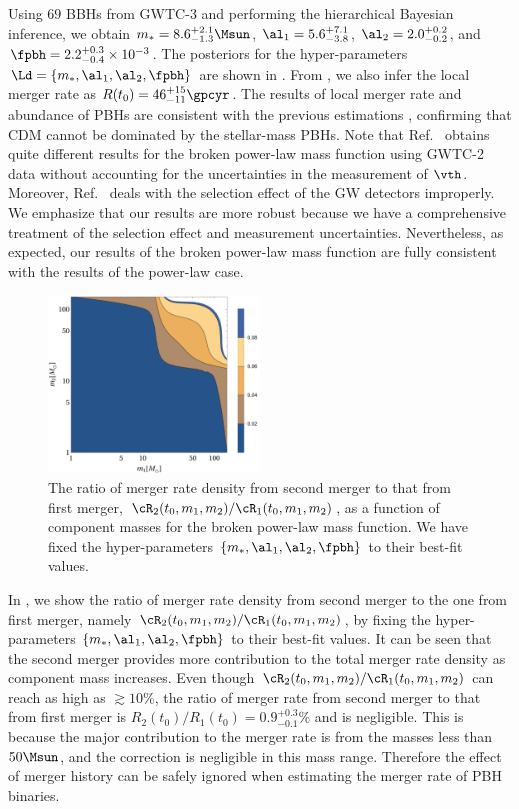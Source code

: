 \documentclass[
reprint,           %
superscriptaddress,%
amsmath,           %
amssymb,           %
aps,               %
prd,               %
notitlepage,       %
longbibliography,  %
floatfix,          %
nofootinbib,
]{revtex4-1}
\begin{document}
Using $69$ BBHs from GWTC-3 and performing the hierarchical Bayesian inference, we obtain $m_* = 8.6^{+2.1}_{-1.3} \Msun$, $\al_1 = 5.6^{+7.1}_{-3.8}$, $\al_2 = 2.0^{+0.2}_{-0.2}$, and $\fpbh = 2.2^{+0.3}_{-0.4} \times 10^{-3}$. The posteriors for the hyper-parameters $\Ld = \{m_*, \al_1, \al_2, \fpbh\}$ are shown in . From , we also infer the local merger rate as $R(t_0) = 46^{+15}_{-11} \gpcyr$. The results of local merger rate and abundance of PBHs are consistent with the previous estimations \cite{Chen:2018czv,Chen:2018rzo,Chen:2019irf,Wu:2020drm,Chen:2021nxo,Chen:2022fda}, confirming that CDM cannot be dominated by the stellar-mass PBHs. Note that Ref.~\cite{Deng:2021ezy} obtains quite different results for the broken power-law mass function using GWTC-2 data without accounting for the uncertainties in the measurement of $\vth$. Moreover, Ref.~\cite{Deng:2021ezy} deals with the selection effect of the GW detectors improperly. We emphasize that our results are more robust because we have a comprehensive treatment of the selection effect and measurement uncertainties. Nevertheless, as expected, our results of the broken power-law mass function are fully consistent with the results of the power-law case.

\begin{figure}[tbp!]
	\centering
	\includegraphics[width=0.5\textwidth]{ratio-bpower.pdf}
	\caption{\label{ratio-bpower}The ratio of merger rate density from second merger to that from first merger, $\cR_2(t_0, m_1, m_2)/\cR_1(t_0, m_1, m_2)$, as a function of component masses for the broken power-law mass function. We have fixed the hyper-parameters $\{m_*, \al_1, \al_2, \fpbh\}$ to their best-fit values.}
\end{figure}

In , we show the ratio of merger rate density from second merger to the one from first merger, namely $\cR_2(t_0, m_1, m_2)/\cR_1(t_0, m_1, m_2)$, by fixing the hyper-parameters $\{m_*, \al_1, \al_2, \fpbh\}$ to their best-fit values. It can be seen that the second merger provides more contribution to the total merger rate density as component mass increases. Even though $\cR_2(t_0, m_1, m_2)/\cR_1(t_0, m_1, m_2)$ can reach as high as $\gtrsim 10\%$, the ratio of merger rate from second merger to that from first merger is $R_2(t_0)/R_1(t_0) = 0.9^{+0.3}_{-0.1}\%$ and is negligible. This is because the major contribution to the merger rate is from the masses less than $50\Msun$, and the correction is negligible in this mass range. Therefore the effect of merger history can be safely ignored when estimating the merger rate of PBH binaries.
\end{document}
